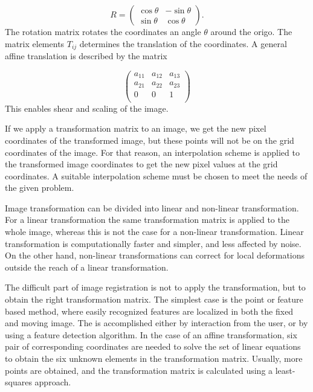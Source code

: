 \begin{equation}
	R = 
	\begin{pmatrix}
	\cos \theta & -\sin \theta\\
	\sin \theta & \cos \theta
	\end{pmatrix}.
\end{equation}
The rotation matrix rotates the coordinates an angle $\theta$ around the origo. The matrix elements $T_{ij}$ determines the translation of the coordinates. A general affine translation is described by the matrix

\begin{equation}
\begin{pmatrix}
 a_{11}&a_{12}&a_{13}\\
 a_{21}&a_{22}&a_{23}\\
 0&0&1\\
 
\end{pmatrix}
\end{equation} 
This enables shear and scaling of the image.

If we apply a transformation matrix to an image, we get the new pixel coordinates of the transformed image, but these points will not be on the grid coordinates of the image. For that reason, an interpolation scheme is applied to the transformed image coordinates to get the new pixel values at the grid coordinates. A suitable interpolation scheme must be chosen to meet the needs of the given problem.

Image transformation can be divided into linear and non-linear transformation. For a linear transformation the same transformation matrix is applied to the whole image, whereas this is not the case for a non-linear transformation. Linear transformation is computationally faster and simpler, and less affected by noise. On the other hand, non-linear transformations can correct for local deformations outside the reach of a linear transformation. 

The difficult part of image registration is not to apply the transformation, but to obtain the right transformation matrix. The simplest case is the point or feature based method, where easily recognized features are localized in both the fixed and moving image. The is accomplished either by interaction from the user, or by using a feature detection algorithm. In the case of an affine transformation, six pair of corresponding coordinates are needed to solve the set of linear equations to obtain the six unknown elements in the transformation matrix. Usually, more points are obtained, and the transformation matrix is calculated using a least-squares approach. 

